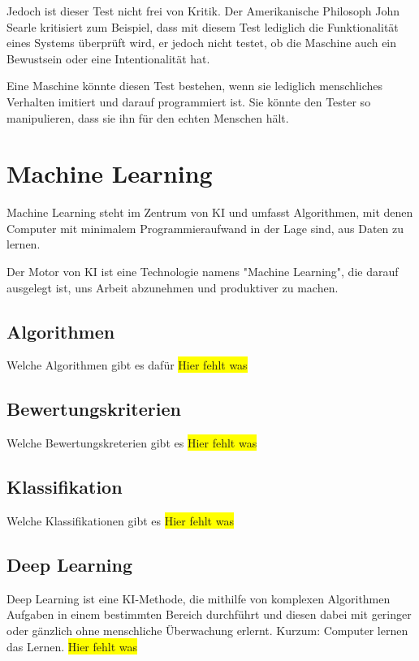 Jedoch ist dieser Test nicht frei von Kritik. Der Amerikanische Philosoph John Searle kritisiert zum Beispiel, dass mit
diesem Test lediglich die Funktionalität eines Systems überprüft wird, er jedoch nicht testet, ob die Maschine auch ein
Bewustsein oder eine Intentionalität hat.

Eine Maschine könnte diesen Test bestehen, wenn sie lediglich menschliches Verhalten imitiert und darauf programmiert
ist. Sie könnte den Tester so manipulieren, dass sie ihn für den echten Menschen hält.

\section{Machine Learning}
Machine Learning steht im Zentrum von KI und umfasst Algorithmen, mit denen Computer mit minimalem Programmieraufwand in
der Lage sind, aus Daten zu lernen.

Der Motor von KI ist eine Technologie namens "Machine Learning", die darauf ausgelegt ist, uns Arbeit abzunehmen und
produktiver zu machen.

\subsection{Algorithmen}
Welche Algorithmen gibt es dafür
\colorbox{yellow}{Hier fehlt was}

\subsection{Bewertungskriterien}
Welche Bewertungskreterien gibt es
\colorbox{yellow}{Hier fehlt was}

\subsection{Klassifikation}
Welche Klassifikationen gibt es
\colorbox{yellow}{Hier fehlt was}

\subsection{Deep Learning}
Deep Learning ist eine KI-Methode, die mithilfe von komplexen Algorithmen Aufgaben in einem bestimmten Bereich
durchführt und diesen dabei mit geringer oder gänzlich ohne menschliche Überwachung erlernt. Kurzum: Computer lernen das
Lernen.
\colorbox{yellow}{Hier fehlt was}

